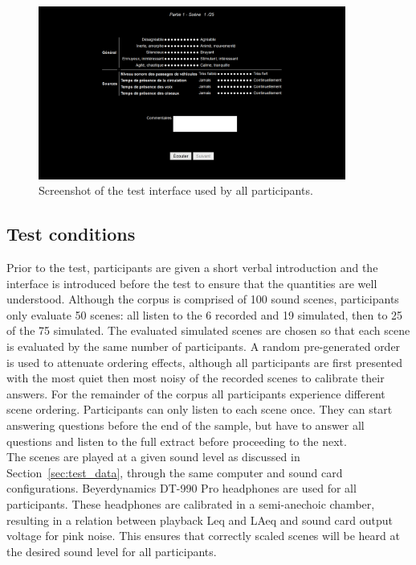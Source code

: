 \documentclass[11pt,a4paper]{article}
\begin{document}
\begin{figure}
    \centering
    \includegraphics[width=0.9\textwidth]{figures/interface.png}
    \caption{Screenshot of the test interface used by all participants.}\label{fig:interface}
\end{figure}

\subsection{Test conditions}
\label{sec:test_conditions}

Prior to the test, participants are given a short verbal introduction and the interface is introduced before the test to ensure that the quantities are well understood. Although the corpus is comprised of 100 sound scenes, participants only evaluate 50 scenes: all listen to the 6 recorded and 19 simulated, then to 25 of the 75 simulated. The evaluated simulated scenes are chosen so that each scene is evaluated by the same number of participants. A random pre-generated order is used to attenuate ordering effects, although all participants are first presented with the most quiet then most noisy of the recorded scenes to calibrate their answers. For the remainder of the corpus all participants experience different scene ordering. Participants can only listen to each scene once. They can start answering questions before the end of the sample, but have to answer all questions and listen to the full extract before proceeding to the next.\\

The scenes are played at a given sound level as discussed in Section~\ref{sec:test_data}, through the same computer and sound card configurations. Beyerdynamics DT-990 Pro headphones are used for all participants. These headphones are calibrated in a semi-anechoic chamber, resulting in a relation between playback Leq and LAeq and sound card output voltage for pink noise. This ensures that correctly scaled scenes will be heard at the desired sound level for all participants.\\
\end{document}

